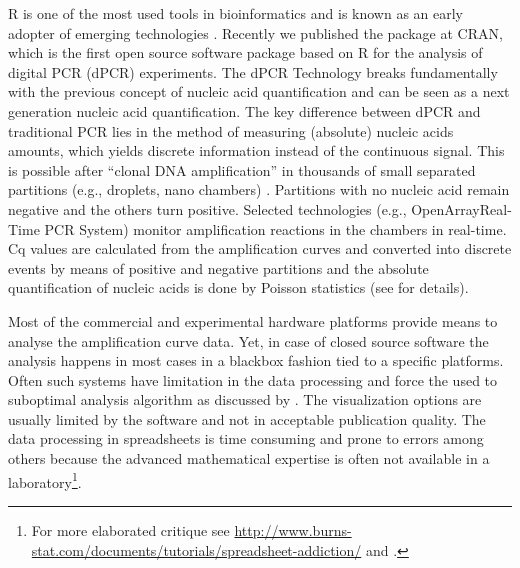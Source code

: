 R is one of the most used tools in bioinformatics and is known as an early 
adopter of emerging technologies \citep{pabinger_2014}. Recently we published 
the  package at CRAN, which is the first open source software 
package based on R for the analysis of digital PCR (dPCR) experiments. The dPCR 
Technology breaks fundamentally with the previous concept of nucleic acid 
quantification and can be seen as a next generation nucleic acid quantification. 
The key difference between dPCR and traditional PCR lies in the method of 
measuring (absolute) nucleic acids amounts, which yields discrete information
instead of the continuous signal. This is possible after ``clonal DNA 
amplification'' in thousands of small separated partitions (e.g., droplets, nano 
chambers) \citep{huggett_2013, milbury_2014, morley_2014}. Partitions with no 
nucleic acid remain negative and the others turn positive. Selected technologies 
(e.g., OpenArray\textregistered Real-Time PCR System) monitor amplification 
reactions in the chambers in real-time. Cq values are calculated from the 
amplification curves and converted into discrete events by means of positive and 
negative partitions and the absolute quantification of nucleic acids is done by 
Poisson statistics (see  for details).

Most of the commercial and experimental hardware platforms provide means to 
analyse the amplification curve data. Yet, in case of closed source software the 
analysis happens in most cases in a blackbox fashion tied to a specific 
platforms. Often such systems have limitation in the data processing and force 
the used to suboptimal analysis algorithm as discussed by \citet{ruijter_2013}. 
The visualization options are usually limited by the software and not in 
acceptable publication quality. The data processing in spreadsheets is time 
consuming and prone to errors among others because the advanced mathematical 
expertise is often not available in a laboratory\footnote{For more elaborated 
critique see 
\url{http://www.burns-stat.com/documents/tutorials/spreadsheet-addiction/} and 
\citet{mccullough_2008}.}.


